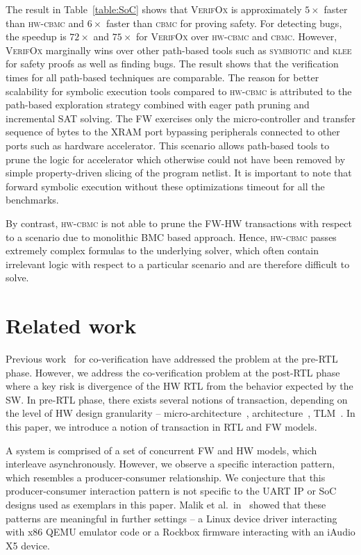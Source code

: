 \documentclass[sigconf]{acmart}
\newcommand{\tool}[1]{\textsc{#1}\xspace}
\newcommand{\cbmcv}{\tool{cbmc}}
\newcommand{\hwcbmcv}{\tool{hw-cbmc}}
\newcommand{\verifox}{\tool{VerifOx}}
\newcommand{\klee}{\tool{klee}}
\newcommand{\symbiotic}{\tool{symbiotic}}
\begin{document}
The result in Table~\ref{table:SoC} shows that \verifox is approximately
$5\times$ faster than \hwcbmcv and $6\times$ faster than \cbmcv for proving
safety.  For detecting bugs, the speedup is $72\times$ and $75\times$ for
\verifox over \hwcbmcv and \cbmcv.  However, \verifox marginally wins over
other path-based tools such as \symbiotic and \klee for safety proofs as
well as finding bugs. The result shows that the verification times for all
path-based techniques are comparable.  The reason for better scalability for
symbolic execution tools compared to \hwcbmcv is attributed to the path-based 
exploration strategy combined with eager path pruning and incremental SAT
solving. The FW exercises only the micro-controller
and transfer sequence of bytes to the XRAM port bypassing peripherals
connected to other ports such as hardware accelerator.  This scenario
allows path-based tools to prune the logic for accelerator which otherwise
could not have been removed by simple property-driven slicing of the
program netlist.  It is important to note that forward symbolic execution without
these optimizations timeout for all the benchmarks.

By contrast, \hwcbmcv is not able to prune the FW-HW transactions with
respect to a scenario due to monolithic BMC based approach.  Hence, \hwcbmcv
passes extremely complex formulas to the underlying solver, which often
contain irrelevant logic with respect to a particular scenario and are
therefore difficult to solve.

\section{Related work}

Previous work~\cite{codes14,codes15,fmcad13,memocode06} for 
co-verification have addressed the problem at the pre-RTL phase. 
However, we address the co-veri\-fi\-cation problem at the post-RTL
phase~\cite{fase10,vlsid13} where a key risk is divergence of the 
HW RTL from the behavior expected by the SW. In pre-RTL phase, 
there exists several notions of transaction, depending on the level 
of HW design granularity -- micro-architecture~\cite{mcbmq},
architecture~\cite{mcbmq}, TLM~\cite{tlm-book,hvc}. In this paper, 
we introduce a notion of transaction in RTL and FW models.      

A system is comprised of a set of concurrent FW and HW models, which
interleave asynchronously.  However, we observe a specific interaction
pattern, which resembles a producer-consumer relationship.  We conjecture
that this producer-consumer interaction pattern is not specific to the UART
IP or SoC designs used as exemplars in this paper.  Malik et
al.~in~\cite{hvc} showed that these patterns are meaningful in further
settings -- a Linux device driver interacting with x86 QEMU emulator code or
a Rockbox firmware interacting with an iAudio X5 device.
\end{document}

